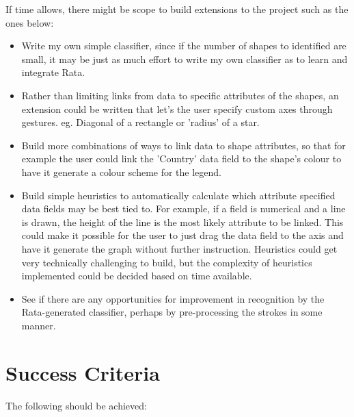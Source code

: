 If time allows, there might be scope to build extensions to the project such as the ones below:
\begin{itemize}

\item Write my own simple classifier, since if the number of shapes to identified are small, it may be just as much effort to write my own classifier as to learn and integrate Rata.

\item Rather than limiting links from data to specific attributes of the shapes, an extension could be written that let's the user specify custom axes through gestures. eg. Diagonal of a rectangle or 'radius' of a star.

\item Build more combinations of ways to link data to shape attributes, so that for example the user could link the 'Country' data field to the shape's colour to have it  generate a colour scheme for the legend.

\item Build simple heuristics to automatically calculate which attribute specified data fields may be best tied to. For example, if a field is numerical and a line is drawn, the height of the line is the most likely attribute to be linked. This could make it possible for the user to just drag the data field to the axis and have it generate the graph without further instruction. Heuristics could get very technically challenging to build, but the complexity of heuristics implemented could be decided based on time available.


\item See if there are any opportunities for improvement in recognition by the Rata-generated classifier, perhaps by pre-processing the strokes in some manner.


\end{itemize}










\section*{Success Criteria}

The following should be achieved:

